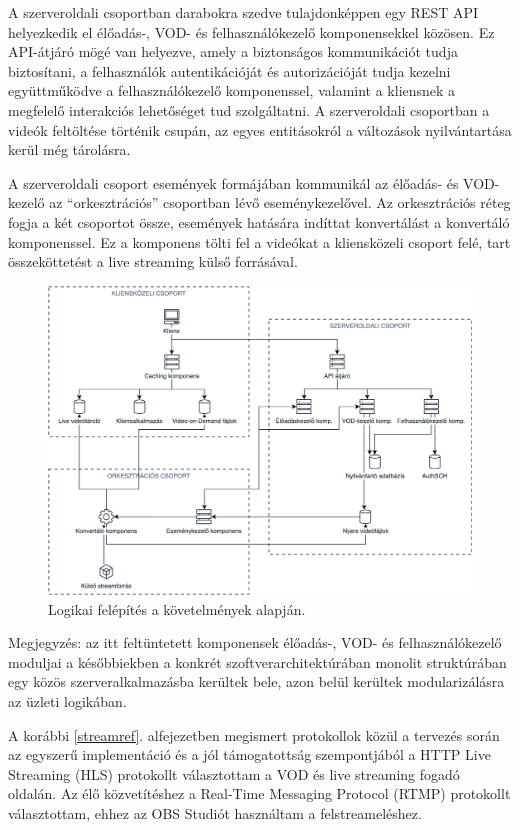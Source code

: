A szerveroldali csoportban darabokra szedve tulajdonképpen egy REST API helyezkedik el élőadás-, VOD- és felhasználókezelő komponensekkel közösen. Ez API-átjáró mögé van helyezve, amely a biztonságos kommunikációt tudja biztosítani, a felhasználók autentikációját és autorizációját tudja kezelni együttműködve a felhasználókezelő komponenssel, valamint a kliensnek a megfelelő interakciós lehetőséget tud szolgáltatni. A szerveroldali csoportban a videók feltöltése történik csupán, az egyes entitásokról a változások nyilvántartása kerül még tárolásra.

A szerveroldali csoport események formájában kommunikál az élőadás- és VOD-kezelő az ``orkesztrációs'' csoportban lévő eseménykezelővel. Az orkesztrációs réteg fogja a két csoportot össze, események hatására indíttat konvertálást a konvertáló komponenssel. Ez a komponens tölti fel a videókat a kliensközeli csoport felé, tart összeköttetést a live streaming külső forrásával.

\begin{figure}[ht]
	\centering
	\includegraphics[width=140mm, keepaspectratio]{figures/dipterv_highlevel.png}
	\caption{Logikai felépítés a követelmények alapján.}
	\label{fig:highlevel}
\end{figure}

Megjegyzés: az itt feltüntetett komponensek élőadás-, VOD- és felhasználókezelő moduljai a későbbiekben a konkrét szoftverarchitektúrában monolit struktúrában egy közös szerveralkalmazásba kerültek bele, azon belül kerültek modularizálásra az üzleti logikában.

A korábbi \ref{streamref}. alfejezetben megismert protokollok közül a tervezés során az egyszerű implementáció és a jól támogatottság szempontjából a HTTP Live Streaming (HLS) protokollt választottam a VOD és live streaming fogadó oldalán. Az élő közvetítéshez a Real-Time Messaging Protocol (RTMP) protokollt választottam, ehhez az OBS Studiót használtam a felstreameléshez.

